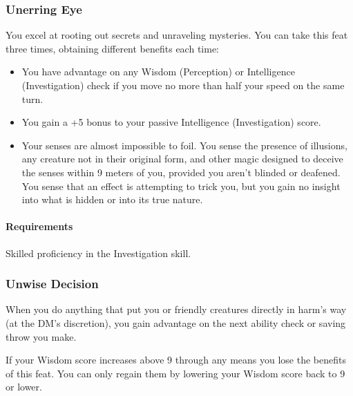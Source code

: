 \subsubsection{Unerring Eye} \label{feat::unerringeye}
    You excel at rooting out secrets and unraveling mysteries.
    You can take this feat three times, obtaining different benefits each time:
    \begin{itemize}
        \item You have advantage on any Wisdom (Perception) or Intelligence (Investigation) check if you move no more than half your speed on the same turn.
        \item You gain a +5 bonus to your passive Intelligence (Investigation) score.
        \item Your senses are almost impossible to foil.
        You sense the presence of illusions, any creature not in their original form, and other magic designed to deceive the senses within 9 meters of you, provided you aren't blinded or deafened.
        You sense that an effect is attempting to trick you, but you gain no insight into what is hidden or into its true nature.
    \end{itemize}
    \paragraph{Requirements} Skilled proficiency in the Investigation skill.
\subsubsection{Unwise Decision} \label{feat::unwisedecision}
    When you do anything that put you or friendly creatures directly in harm's way (at the DM's discretion), you gain advantage on the next ability check or saving throw you make.

    If your Wisdom score increases above 9 through any means you lose the benefits of this feat.
    You can only regain them by lowering your Wisdom score back to 9 or lower.
